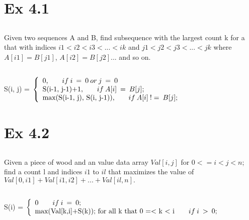  \section{Ex 4.1}
 \subsection{}
 Given two sequences A and B,  find subsequence with the largest count k for a that with indices $i1 < i2 < i3 <...<ik$ and $j1 < j2 < j3 <...<jk$ where $A[i1] = B[j1]$, $A[i2] = B[j2]$... and so on.

\subsection{}
  S(i, j) =
   \begin{math}
  \left\{
    \begin{array}{l}
      $0,$             \qquad             if \: i \:  = \: 0 \: or \: j\:  =\:  0\\
      $S(i-1, j-1)+1,$             \qquad             if \: A[i] \:  = \: B[j];\\
       $max(S(i-1, j), S(i, j-1)),$     \qquad         if \: A[i] \:  != \: B[j];\\
    \end{array}
  \right.
\end{math}

\section{Ex 4.2}
 \subsection{}
 Given a piece of wood and an value data array $Val[i, j]$ for $0<=i<j<n$;\\
 find a count l and indices $i1$ to $ il$ that maximizes the value of $Val[0, i1]+ Val[i1, i2] +...+ Val[il, n].$

\subsection{}
  S(i) =
   \begin{math}
  \left\{
    \begin{array}{l}
     $0$             \qquad             if \:  i\:  = \: 0;\\
       $max(Val[k,i]+S(k)); for all k that 0 =< k < i$     \qquad         if \: i \:  > \: 0;\\
    \end{array}
  \right.
\end{math}


